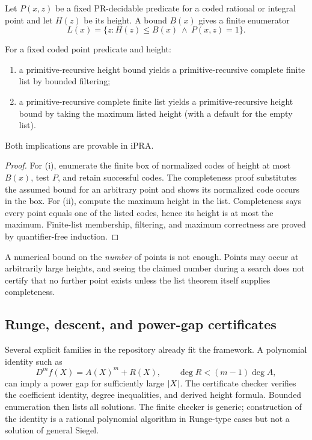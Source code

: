 Let $P(x,z)$ be a fixed PR-decidable predicate for a coded rational or integral point and let $H(z)$ be its height.  A bound $B(x)$ gives a finite enumerator
\[
 L(x)=\{z:H(z)\le B(x)\ \wedge\ P(x,z)=1\}.
\]

\begin{theorem}
\label{thm:height-list}
For a fixed coded point predicate and height:
\begin{enumerate}[label=(\roman*)]
\item a primitive-recursive height bound yields a primitive-recursive complete finite list by bounded filtering;
\item a primitive-recursive complete finite list yields a primitive-recursive height bound by taking the maximum listed height (with a default for the empty list).
\end{enumerate}
Both implications are provable in iPRA.
\end{theorem}

\begin{proof}
For (i), enumerate the finite box of normalized codes of height at most $B(x)$, test $P$, and retain successful codes.  The completeness proof substitutes the assumed bound for an arbitrary point and shows its normalized code occurs in the box.  For (ii), compute the maximum height in the list.  Completeness says every point equals one of the listed codes, hence its height is at most the maximum.  Finite-list membership, filtering, and maximum correctness are proved by quantifier-free induction.
\end{proof}

A numerical bound on the \emph{number} of points is not enough.  Points may occur at arbitrarily large heights, and seeing the claimed number during a search does not certify that no further point exists unless the list theorem itself supplies completeness.

\subsection{Runge, descent, and power-gap certificates}

Several explicit families in the repository already fit the framework.  A polynomial identity such as
\[
 D^m f(X)=A(X)^m+R(X),
 \qquad \deg R<(m-1)\deg A,
\]
can imply a power gap for sufficiently large $\lvert X\rvert$.  The certificate checker verifies the coefficient identity, degree inequalities, and derived height formula.  Bounded enumeration then lists all solutions.  The finite checker is generic; construction of the identity is a rational polynomial algorithm in Runge-type cases but not a solution of general Siegel.

